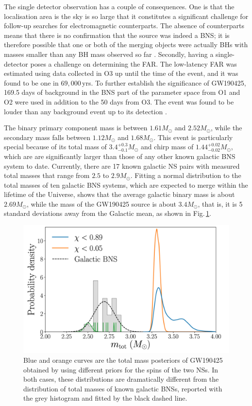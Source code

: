 \documentclass[binding=0.6cm, LaM]{sapthesis}
\begin{document}
	The single detector observation has a couple of consequences. 
	One is that the localisation area is the sky is so large
	that it constitutes a significant challenge for follow-up searches for electromagnetic counterparts. 
	The absence of counterparts means that there is no confirmation that the source was indeed a BNS; 
	it is therefore possible that one or both of the merging objects were actually 
	BHs with masses smaller than any BH mass observed so far \cite{175}.
	Secondly, having a single-detector poses a challenge on determining the FAR.
	The low-latency FAR was estimated using data collected in O3 
	up until the time of the event, and it was found to be one in $69,000\,$yrs. 
	To further establish the significance of GW190425, 169.5 
	days of background in the BNS part of the parameter space from O1 and O2 were used in addition to the 50 days  
	from O3.  The event was found to be 
	louder than any background event up to its detection \cite{175}.

	The binary primary component mass is between $1.61M_\odot$ and $2.52 M_\odot$, 
	while the secondary mass falls between $1.12M_\odot$ and $1.68 M_\odot$.
	This event is particularly special because of its total mass of $3.4^{+0.3}_{-0.1} M_\odot$ 
	and chirp mass of $1.44^{+0.02}_{-0.02}M_\odot$, which are are significantly larger 
	than those of any other known galactic BNS system to date. 
	Currently, there are 17 known galactic NS pairs with measured total masses 
	that range from $2.5$ to $2.9M_\odot$.
	Fitting a normal distribution to the total masses of ten galactic BNS systems, 
	which are expected to merge within the lifetime of the Universe, 
	shows that the average galactic binary mass is about $2.69M_\odot$, 
	while the mass of the GW190425 source is about $3.4M_\odot$, that is,
	it is 5 standard deviations away from the Galactic mean, as shown in Fig.\,\ref{fig:secondbns}.

        \begin{figure}[!t]
          \label{secondbns}
          \includegraphics[scale=0.3]{secondbns}
          \centering
          \caption{Blue and orange curves are the total mass posteriors of GW190425 obtained by using different priors for the spins of the two NSs. In both cases, these distributions are dramatically different from the distribution of total masses of known galactic BNSs, reported with the grey histogram and fitted by the black dashed line. \cite{62}}
          \label{fig:secondbns}
        \end{figure}
\end{document}
